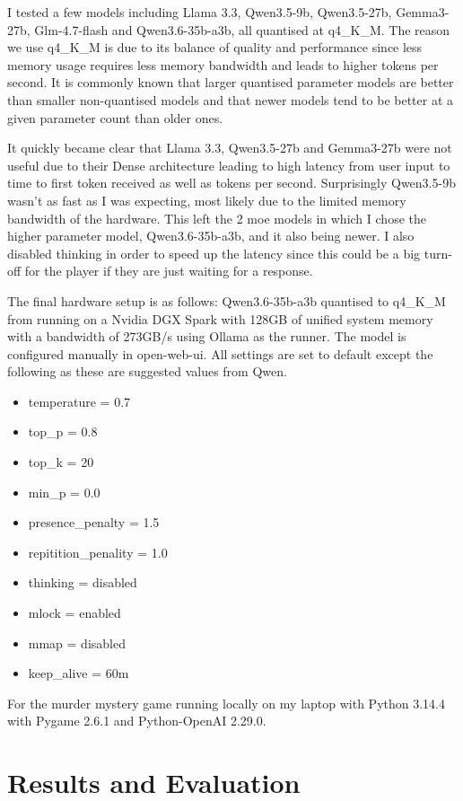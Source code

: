 \documentclass[12pt, a4paper]{report}
\begin{document}
	I tested a few models including Llama 3.3, Qwen3.5-9b, Qwen3.5-27b, Gemma3-27b, Glm-4.7-flash and Qwen3.6-35b-a3b, all quantised at q4\_K\_M. The reason we use q4\_K\_M is due to its balance of quality and performance since less memory usage requires less memory bandwidth and leads to higher tokens per second. It is commonly known that larger quantised parameter models are better than smaller non-quantised models and that newer models tend to be better at a given parameter count than older ones.
	
	It quickly became clear that Llama 3.3, Qwen3.5-27b and Gemma3-27b were not useful due to their Dense architecture leading to high latency from user input to time to first token received as well as tokens per second. Surprisingly Qwen3.5-9b wasn't as fast as I was expecting, most likely due to the limited memory bandwidth of the hardware. This left the 2 \gls{moe} models in which I chose the higher parameter model, Qwen3.6-35b-a3b, and it also being newer. I also disabled thinking in order to speed up the latency since this could be a big turn-off for the player if they are just waiting for a response.
	
	The final hardware setup is as follows: Qwen3.6-35b-a3b quantised to q4\_K\_M from \cite{ollamaTagsQwen36} running on a Nvidia DGX Spark with 128GB of unified system memory with a bandwidth of 273GB/s using Ollama as the runner. The model is configured manually in open-web-ui. All settings are set to default except the following as these are suggested values from Qwen.
	
	\begin{itemize}
		\item temperature = 0.7
		\item top\_p = 0.8
		\item top\_k = 20
		\item min\_p = 0.0
		\item presence\_penalty = 1.5
		\item repitition\_penality = 1.0
		\item thinking = disabled
		\item mlock = enabled
		\item mmap = disabled
		\item keep\_alive = 60m
	\end{itemize}
	
	For the murder mystery game running locally on my laptop with Python 3.14.4 with Pygame 2.6.1 and Python-OpenAI 2.29.0.

	\chapter{Results and Evaluation}
\end{document}
